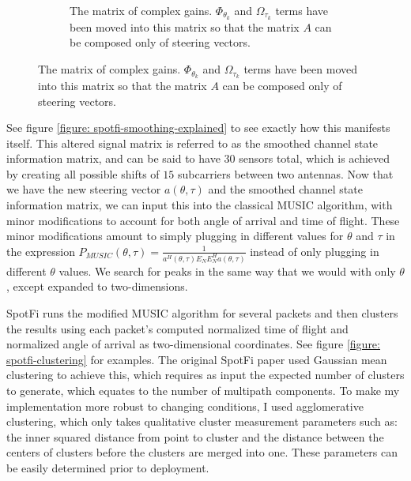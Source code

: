 \documentclass[12pt]{report}
\begin{document}
\begin{figure}%
    \begin{center}
        \ContinuedFloat
        \par\bigskip
        \begin{subfigure}[h]{0.85\textwidth}
            \caption{The matrix of complex gains. $\Phi_{\theta_{k}}$ and $\Omega_{\tau_{k}}$ terms have been moved into this matrix so that the matrix $A$ can be composed only of steering vectors.}
            \label{subfigure: complex-gains-matrix}
            \centerline{\scalebox{0.65}{}}
        \end{subfigure}
        \par\bigskip
    \end{center}
\end{figure}

See figure \ref{figure: spotfi-smoothing-explained} to see exactly how this manifests itself. This altered signal matrix is referred to as the smoothed channel state information matrix, and can be said to have $30$ sensors total, which is achieved by creating all possible shifts of $15$ subcarriers between two antennas. Now that we have the new steering vector $a(\theta, \tau)$ and the smoothed channel state information matrix, we can input this into the classical MUSIC algorithm, with minor modifications to account for both angle of arrival and time of flight. These minor modifications amount to simply plugging in different values for $\theta$ and $\tau$ in the expression $P_{MUSIC}(\theta, \tau) = \frac{1}{a^{H}(\theta, \tau) E_{N} E^{H}_{N} a(\theta, \tau)}$ instead of only plugging in different $\theta$ values. We search for peaks in the same way that we would with only $\theta$, except expanded to two-dimensions. \par

SpotFi runs the modified MUSIC algorithm for several packets and then clusters the results using each packet's computed normalized time of flight and normalized angle of arrival as two-dimensional coordinates. See figure \ref{figure: spotfi-clustering} for examples. The original SpotFi paper used Gaussian mean clustering to achieve this, which requires as input the expected number of clusters to generate, which equates to the number of multipath components. To make my implementation more robust to changing conditions, I used agglomerative clustering, which only takes qualitative cluster measurement parameters such as: the inner squared distance from point to cluster and the distance between the centers of clusters before the clusters are merged into one. These parameters can be easily determined prior to deployment. \par
\end{document}
